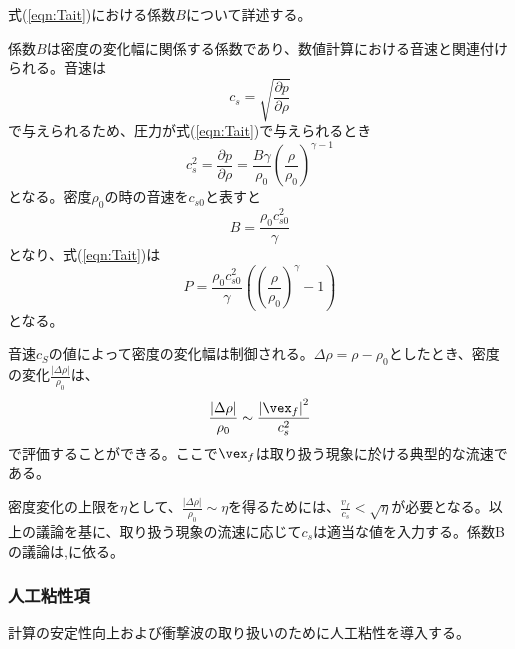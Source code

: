 \documentclass[]{jsarticle}
\begin{document}
式(\ref{eqn:Tait})における係数$B$について詳述する。

係数$B$は密度の変化幅に関係する係数であり、数値計算における音速と関連付けられる。音速は
\begin{equation}
c_s=\sqrt{\frac{\partial p}{\partial \rho}}
\end{equation}
で与えられるため、圧力が式(\ref{eqn:Tait})で与えられるとき
\begin{equation}
c_s^2=\frac{\partial p}{\partial \rho}=\frac{B\gamma}{\rho_0}\left(\frac{\rho}{\rho_0}\right)^{\gamma -1}
\end{equation}
となる。密度$\rho_0$の時の音速を$c_{s0}$と表すと
\begin{equation}
B=\frac{\rho_0c_{s0}^2}{\gamma}
\end{equation}
となり、式(\ref{eqn:Tait})は
\begin{equation}
P=\frac{\rho_0c_{s0}^2}{\gamma}\left(\left(\frac{\rho}{\rho_0}\right)^\gamma-1\right)
\end{equation}
となる。

音速$c_S$の値によって密度の変化幅は制御される。$\Delta \rho=\rho-\rho_0$としたとき、密度の変化$\frac{\left| \Delta \rho \right|}{\rho_0}$は、
\begin{equation}
\frac{\left| \Delta \rho \right|}{\rho_0}\sim \frac{\left| \vex_f \right|^2}{c_s^2}
\end{equation}
で評価することができる。ここで$\vex_f$は取り扱う現象に於ける典型的な流速である。

密度変化の上限を$\eta$として、$\frac{\left| \Delta \rho \right|}{\rho_0}\sim \eta$を得るためには、$\frac{v_f}{c_s}<\sqrt{\eta}$が必要となる。以上の議論を基に、取り扱う現象の流速に応じて$c_s$は適当な値を入力する。係数Bの議論は\cite{Becker2007},\cite{Gotoh2018}に依る。


\subsubsection{人工粘性項}
計算の安定性向上および衝撃波の取り扱いのために人工粘性を導入する。
\end{document}
